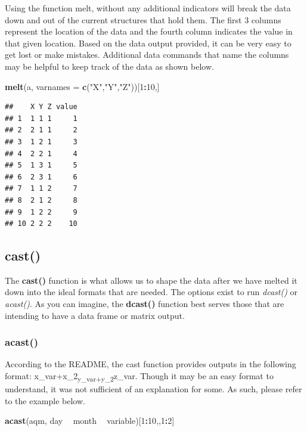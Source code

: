 \documentclass[]{book}
\newenvironment{Shaded}{\begin{snugshade}}{\end{snugshade}}
\newcommand{\DataTypeTok}[1]{\textcolor[rgb]{0.13,0.29,0.53}{#1}}
\newcommand{\DecValTok}[1]{\textcolor[rgb]{0.00,0.00,0.81}{#1}}
\newcommand{\KeywordTok}[1]{\textcolor[rgb]{0.13,0.29,0.53}{\textbf{#1}}}
\newcommand{\NormalTok}[1]{#1}
\newcommand{\OperatorTok}[1]{\textcolor[rgb]{0.81,0.36,0.00}{\textbf{#1}}}
\newcommand{\StringTok}[1]{\textcolor[rgb]{0.31,0.60,0.02}{#1}}
\begin{document}
Using the function melt, without any additional indicators will break the data down and out of the current structures that hold them. The first 3 columns represent the location of the data and the fourth column indicates the value in that given location. Based on the data output provided, it can be very easy to get lost or make mistakes. Additional data commands that name the columns may be helpful to keep track of the data as shown below.

\begin{Shaded}
\begin{Highlighting}[]
\KeywordTok{melt}\NormalTok{(a, }\DataTypeTok{varnames =} \KeywordTok{c}\NormalTok{(}\StringTok{"X"}\NormalTok{,}\StringTok{"Y"}\NormalTok{,}\StringTok{"Z"}\NormalTok{))[}\DecValTok{1}\OperatorTok{:}\DecValTok{10}\NormalTok{,]}
\end{Highlighting}
\end{Shaded}

\begin{verbatim}
##    X Y Z value
## 1  1 1 1     1
## 2  2 1 1     2
## 3  1 2 1     3
## 4  2 2 1     4
## 5  1 3 1     5
## 6  2 3 1     6
## 7  1 1 2     7
## 8  2 1 2     8
## 9  1 2 2     9
## 10 2 2 2    10
\end{verbatim}

\hypertarget{cast}{%
\subsection{cast()}\label{cast}}

The \textbf{cast()} function is what allows us to shape the data after we have melted it down into the ideal formats that are needed. The options exist to run \emph{dcast()} or \emph{acast()}. As you can imagine, the \textbf{dcast()} function best serves those that are intending to have a data frame or matrix output.

\hypertarget{acast}{%
\subsubsection{acast()}\label{acast}}

According to the README, the cast function provides outputs in the following format: x\_var+x\_2\textsubscript{y\_var+y\_2}z\_var. Though it may be an easy format to understand, it was not sufficient of an explanation for some. As such, please refer to the example below.

\begin{Shaded}
\begin{Highlighting}[]
\KeywordTok{acast}\NormalTok{(aqm, day }\OperatorTok{~}\StringTok{ }\NormalTok{month }\OperatorTok{~}\StringTok{ }\NormalTok{variable)[}\DecValTok{1}\OperatorTok{:}\DecValTok{10}\NormalTok{,,}\DecValTok{1}\OperatorTok{:}\DecValTok{2}\NormalTok{]}
\end{Highlighting}
\end{Shaded}
\end{document}
